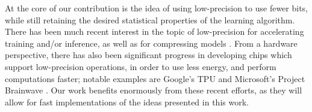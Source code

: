 At the core of our contribution is the idea of using low-precision to use fewer bits, while still retaining the desired statistical properties of the learning algorithm.  There has been much recent interest in the topic of low-precision for accelerating training and/or inference, as well as for compressing models \citep{gupta15,hogwild15,hubara16,halp18,desa17,han15}.  From a hardware perspective, there has also been significant progress in developing chips which support low-precision operations, in order to use less energy, and perform computations faster; notable examples are Google's TPU \citep{tpu17} and Microsoft's Project Brainwave \citep{brainwave17}.  Our work benefits enormously from these recent efforts, as they will allow for fast implementations of the ideas presented in this work.
